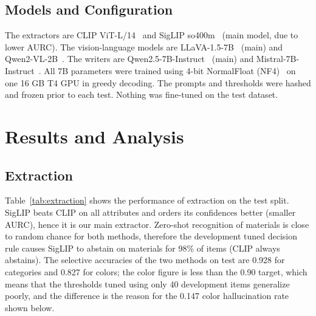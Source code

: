 \documentclass[runningheads]{llncs}
\begin{document}
\subsection{Models and Configuration}
The extractors are CLIP ViT-L/14~\cite{radford2021clip} and SigLIP so400m~\cite{zhai2023siglip} (main model, due to lower AURC). The vision-language models are LLaVA-1.5-7B~\cite{liu2024llava15} (main) and Qwen2-VL-2B~\cite{wang2024qwen2vl}. The writers are Qwen2.5-7B-Instruct~\cite{yang2024qwen25} (main) and Mistral-7B-Instruct~\cite{jiang2023mistral}. All 7B parameters were trained using 4-bit NormalFloat (NF4)~\cite{dettmers2023qlora} on one 16 GB T4 GPU in greedy decoding. The prompts and thresholds were hashed and frozen prior to each test. Nothing was fine-tuned on the test dataset.

\section{Results and Analysis}\label{sec:results}
\subsection{Extraction}
Table~\ref{tab:extraction} shows the performance of extraction on the test split. SigLIP beats CLIP on all attributes and orders its confidences better (smaller AURC), hence it is our main extractor. Zero-shot recognition of materials is close to random chance for both methods, therefore the development tuned decision rule causes SigLIP to abstain on materials for 98\% of items (CLIP always abstains). The selective accuracies of the two methods on test are 0.928 for categories and 0.827 for colors; the color figure is less than the 0.90 target, which means that the thresholds tuned using only 40 development items generalize poorly, and the difference is the reason for the 0.147 color hallucination rate shown below.
\end{document}
